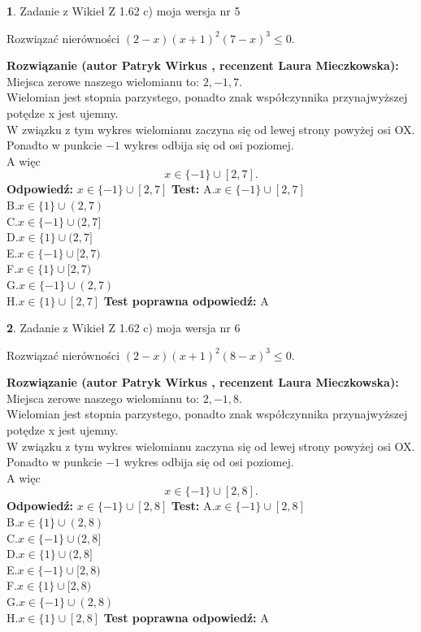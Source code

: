 \documentclass[12pt, a4paper]{article}
\theoremstyle{definition} %
\newtheorem{zad}{}
\newcommand{\zadStart}[1]{\begin{zad}#1\newline}
\newcommand{\zadStop}{\end{zad}}
\newcommand{\rozwStart}[2]{\noindent \textbf{Rozwiązanie (autor #1 , recenzent #2): }\newline}
\newcommand{\rozwStop}{\newline}
\newcommand{\odpStart}{\noindent \textbf{Odpowiedź:}\newline}
\newcommand{\odpStop}{\newline}
\newcommand{\testStart}{\noindent \textbf{Test:}\newline}
\newcommand{\testStop}{\newline}
\newcommand{\kluczStart}{\noindent \textbf{Test poprawna odpowiedź:}\newline}
\newcommand{\kluczStop}{\newline}
\begin{document}
\zadStart{Zadanie z Wikieł Z 1.62 c) moja wersja nr 5}

Rozwiązać nierówności $(2-x)(x+1)^{2}(7-x)^{3}\le0$.
\zadStop
\rozwStart{Patryk Wirkus}{Laura Mieczkowska}
Miejsca zerowe naszego wielomianu to: $2, -1, 7$.\\
Wielomian jest stopnia parzystego, ponadto znak współczynnika przy\linebreak najwyższej potędze x jest ujemny.\\ W związku z tym wykres wielomianu zaczyna się od lewej strony powyżej osi OX.\\
Ponadto w punkcie $-1$ wykres odbija się od osi poziomej.\\
A więc $$x \in \{-1\} \cup [2,7].$$
\rozwStop
\odpStart
$x \in \{-1\} \cup [2,7]$
\odpStop
\testStart
A.$x \in \{-1\} \cup [2,7]$\\
B.$x \in \{1\} \cup (2,7)$\\
C.$x \in \{-1\} \cup (2,7]$\\
D.$x \in \{1\} \cup (2,7]$\\
E.$x \in \{-1\} \cup [2,7)$\\
F.$x \in \{1\} \cup [2,7)$\\
G.$x \in \{-1\} \cup (2,7)$\\
H.$x \in \{1\} \cup [2,7]$
\testStop
\kluczStart
A
\kluczStop



\zadStart{Zadanie z Wikieł Z 1.62 c) moja wersja nr 6}

Rozwiązać nierówności $(2-x)(x+1)^{2}(8-x)^{3}\le0$.
\zadStop
\rozwStart{Patryk Wirkus}{Laura Mieczkowska}
Miejsca zerowe naszego wielomianu to: $2, -1, 8$.\\
Wielomian jest stopnia parzystego, ponadto znak współczynnika przy\linebreak najwyższej potędze x jest ujemny.\\ W związku z tym wykres wielomianu zaczyna się od lewej strony powyżej osi OX.\\
Ponadto w punkcie $-1$ wykres odbija się od osi poziomej.\\
A więc $$x \in \{-1\} \cup [2,8].$$
\rozwStop
\odpStart
$x \in \{-1\} \cup [2,8]$
\odpStop
\testStart
A.$x \in \{-1\} \cup [2,8]$\\
B.$x \in \{1\} \cup (2,8)$\\
C.$x \in \{-1\} \cup (2,8]$\\
D.$x \in \{1\} \cup (2,8]$\\
E.$x \in \{-1\} \cup [2,8)$\\
F.$x \in \{1\} \cup [2,8)$\\
G.$x \in \{-1\} \cup (2,8)$\\
H.$x \in \{1\} \cup [2,8]$
\testStop
\kluczStart
A
\kluczStop
\end{document}
